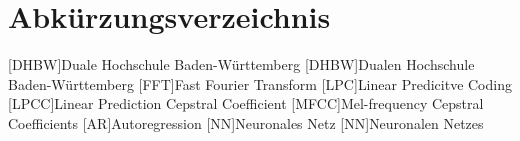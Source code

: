 \section*{Abkürzungsverzeichnis}
\begin{acronym}
  [DHBW]{Duale Hochschule Ba\-den-\-Würt\-tem\-berg}
  [DHBW]{Dualen Hochschule Ba\-den-\-Würt\-tem\-berg}
  [FFT]{Fast Fourier Transform}
  [LPC]{Linear Predicitve Coding}
  [LPCC]{Linear Prediction Cepstral Coefficient}
  [MFCC]{Mel-frequency Cepstral Coefficients}
  [AR]{Autoregression}
  [NN]{Neuronales Netz}
  [NN]{Neuronalen Netzes}
\end{acronym}
\newpage